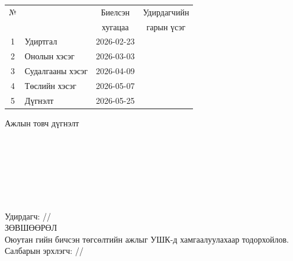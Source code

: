 \begin{titlepage}
\begin{center}
\begin{tabular}{|c|p{7cm}|c|c|}
	\hline
	№ & \makebox[7cm][c]{Хийж гүйцэтгэсэн ажил} & Биелсэн     & Удирдагчийн \\
	  &                    & хугацаа    & гарын үсэг \\ \hline
	1 & {Удиртгал}         & 2026-02-23 &  \\ \hline
	2 & {Онолын хэсэг}     & 2026-03-03 &  \\ \hline
	3 & {Судалгааны хэсэг} & 2026-04-09 &  \\ \hline
	4 & {Төслийн хэсэг}    & 2026-05-07 &  \\ \hline
	5 & {Дүгнэлт}          & 2026-05-25 &  \\ \hline
\end{tabular}

\vspace{1cm}
Ажлын товч дүгнэлт \\[0.5cm]
\dotfill \\[0.2cm]
\dotfill \\[0.2cm]
\dotfill \\[0.2cm]
\dotfill \\[0.2cm]
\dotfill \\[0.2cm]
\dotfill \\[0.2cm]
\dotfill \\[0.5cm]
Удирдагч: \makebox[3cm]{\dotfill} /\supname/ \\

\vspace{2cm}
ЗӨВШӨӨРӨЛ \\[0.5cm]
Оюутан \shortname гийн бичсэн төгсөлтийн ажлыг УШК-д хамгаалуулахаар тодорхойлов.\\[0.5cm]
Салбарын эрхлэгч: \makebox[3cm]{\dotfill} /\chairname/
\end{center}

\end{titlepage}

\newpage

